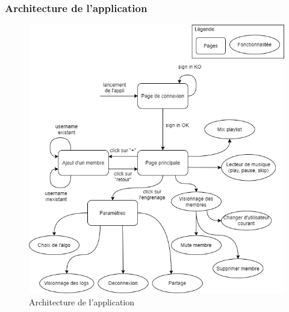 \documentclass{article}
\begin{document}
		\subsubsection{Architecture de l'application}\label{archi_log}
		\begin{figure}[h!]
			\includegraphics[width=\linewidth]{ressources/Architecture_Log.png}
			\caption{Architecture de l'application}
		\end{figure}
	
	    \newpage
\end{document}
